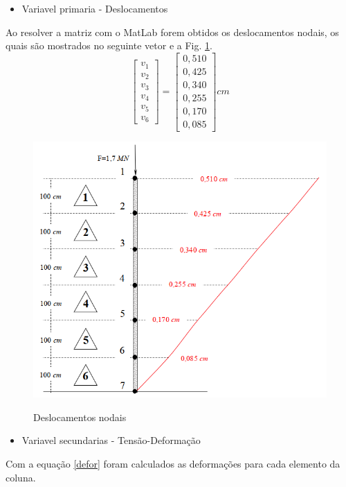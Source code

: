 \documentclass{article} %
\begin{document}
\begin{itemize}
	\item Variavel primaria - Deslocamentos
\end{itemize}

\indent Ao resolver a matriz com o MatLab forem obtidos os deslocamentos nodais, os quais são mostrados no seguinte vetor e a Fig. \ref{deslocamentos}.
\begin{equation*}
\begin{bmatrix}
v_1\\
v_2\\
v_3\\
v_4\\
v_5\\
v_6
\end{bmatrix}=\begin{bmatrix}
0,510\\
0,425\\
0,340\\
0,255\\
0,170\\
0,085
\end{bmatrix}cm
\end{equation*}


\begin{figure}[H]
	\centering
	\caption{Deslocamentos nodais}
	\includegraphics[width=0.7\linewidth]{deslocamentos}	
	\label{deslocamentos}	
\end{figure}

\begin{itemize}
	\item Variavel secundarias - Tensão-Deformação
\end{itemize}
\indent Com a equação \ref{defor} foram calculados as deformações para cada elemento da coluna.
\end{document}
